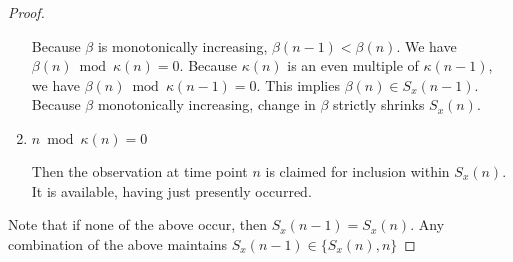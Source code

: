 \begin{proof}
\begin{enumerate}
  Because $\beta$ is monotonically increasing, $\beta(n - 1) < \beta(n)$.
  We have $\beta(n) \bmod \kappa(n) = 0$.
  Because $\kappa(n)$ is an even multiple of $\kappa(n - 1)$, we have $\beta(n) \bmod \kappa(n - 1) = 0$.
  This implies $\beta(n) \in S_x(n - 1)$.
  Because $\beta$ monotonically increasing, change in $\beta$ strictly shrinks $S_x(n)$.

  \item $n \bmod \kappa(n) = 0$

  Then the observation at time point $n$ is claimed for inclusion within $S_x(n)$.
  It is available, having just presently occurred.

\end{enumerate}

Note that if none of the above occur, then $S_x(n - 1) = S_x(n)$.
Any combination of the above maintains $S_x(n - 1) \in \{S_x(n), n\}$
\end{proof}
